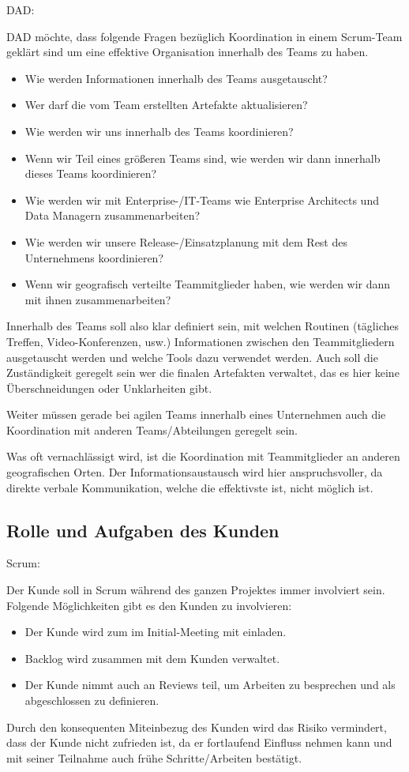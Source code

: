 {\Large DAD:} \cite{planningReleaseDad} \medskip

DAD möchte, dass folgende Fragen bezüglich Koordination in einem Scrum-Team geklärt sind um eine effektive Organisation innerhalb des Teams zu haben.
\begin{itemize}
	\item 	Wie werden Informationen innerhalb des Teams ausgetauscht?
	\item 	Wer darf die vom Team erstellten Artefakte aktualisieren? 
	\item 	Wie werden wir uns innerhalb des Teams koordinieren?
	\item 	Wenn wir Teil eines größeren Teams sind, wie werden wir dann innerhalb dieses Teams koordinieren?
	\item 	Wie werden wir mit Enterprise-/IT-Teams wie Enterprise Architects und Data Managern zusammenarbeiten?
	\item 	Wie werden wir unsere Release-/Einsatzplanung mit dem Rest des Unternehmens koordinieren?
	\item 	Wenn wir geografisch verteilte Teammitglieder haben, wie werden wir dann mit ihnen zusammenarbeiten?
\end{itemize}
Innerhalb des Teams soll also klar definiert sein, mit welchen Routinen (tägliches Treffen, Video-Konferenzen, usw.) Informationen zwischen den Teammitgliedern ausgetauscht werden und welche Tools dazu verwendet werden. Auch soll die Zuständigkeit geregelt sein wer die finalen Artefakten verwaltet, das es hier keine Überschneidungen oder Unklarheiten gibt.
\medskip

Weiter müssen gerade bei agilen Teams innerhalb eines Unternehmen auch die Koordination mit anderen Teams/Abteilungen geregelt sein.
\medskip

Was oft vernachlässigt wird, ist die Koordination mit Teammitglieder an anderen geografischen Orten. Der Informationsaustausch wird hier anspruchsvoller, da direkte verbale Kommunikation, welche die effektivste ist, nicht möglich ist.


\subsection{Rolle und Aufgaben des Kunden}

{\Large Scrum:} \cite{planningPrioScrum} \medskip

Der Kunde soll in Scrum während des ganzen Projektes immer involviert sein. Folgende Möglichkeiten gibt es den Kunden zu involvieren:
\begin{itemize}
	\item Der Kunde wird zum im Initial-Meeting mit einladen.
	\item Backlog wird zusammen mit dem Kunden verwaltet.
	\item Der Kunde nimmt auch an Reviews teil, um Arbeiten zu besprechen und als abgeschlossen zu definieren.
\end{itemize}
Durch den konsequenten Miteinbezug des Kunden wird das Risiko vermindert, dass der Kunde nicht zufrieden ist, da er fortlaufend Einfluss nehmen kann und mit seiner Teilnahme auch frühe Schritte/Arbeiten bestätigt.
\bigskip 

